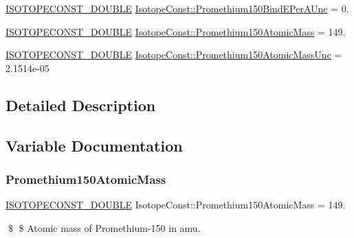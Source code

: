 \begin{DoxyCompactItemize}
\item 
\mbox{\hyperlink{group___isotope_const-_macros_ga8f45a7272ce02c0b4c65c44636ed719a}{I\+S\+O\+T\+O\+P\+E\+C\+O\+N\+S\+T\+\_\+\+D\+O\+U\+B\+LE}} \mbox{\hyperlink{group___isotope_const-_promethium-_pm150_ga6f8b24f8b5455aa1fb080f200eaf6562}{Isotope\+Const\+::\+Promethium150\+Bind\+E\+Per\+A\+Unc}} = 0.
\item 
\mbox{\hyperlink{group___isotope_const-_macros_ga8f45a7272ce02c0b4c65c44636ed719a}{I\+S\+O\+T\+O\+P\+E\+C\+O\+N\+S\+T\+\_\+\+D\+O\+U\+B\+LE}} \mbox{\hyperlink{group___isotope_const-_promethium-_pm150_ga2b8aafd0c8bc584705c1033c4b7d3530}{Isotope\+Const\+::\+Promethium150\+Atomic\+Mass}} = 149.
\item 
\mbox{\hyperlink{group___isotope_const-_macros_ga8f45a7272ce02c0b4c65c44636ed719a}{I\+S\+O\+T\+O\+P\+E\+C\+O\+N\+S\+T\+\_\+\+D\+O\+U\+B\+LE}} \mbox{\hyperlink{group___isotope_const-_promethium-_pm150_ga43d43a58ace38d5454255bfa7181ecd2}{Isotope\+Const\+::\+Promethium150\+Atomic\+Mass\+Unc}} = 2.\+1514e-\/05
\end{DoxyCompactItemize}


\subsection{Detailed Description}


\subsection{Variable Documentation}
\mbox{\label{group___isotope_const-_promethium-_pm150_ga2b8aafd0c8bc584705c1033c4b7d3530}} 
\subsubsection{\texorpdfstring{Promethium150\+Atomic\+Mass}{Promethium150AtomicMass}}
{\footnotesize\ttfamily \mbox{\hyperlink{group___isotope_const-_macros_ga8f45a7272ce02c0b4c65c44636ed719a}{I\+S\+O\+T\+O\+P\+E\+C\+O\+N\+S\+T\+\_\+\+D\+O\+U\+B\+LE}} Isotope\+Const\+::\+Promethium150\+Atomic\+Mass = 149.}

\$ \$ Atomic mass of Promethium-\/150 in amu. \mbox{\label{group___isotope_const-_promethium-_pm150_ga43d43a58ace38d5454255bfa7181ecd2}} 
